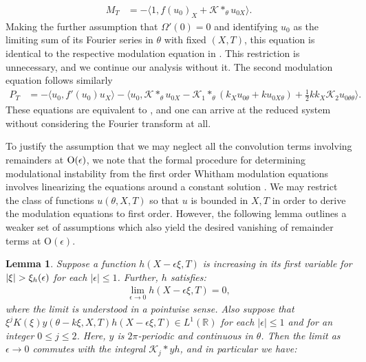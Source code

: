 \documentclass[11pt,leqno]{article}
\numberwithin{equation}{section}
\newcommand{\R}{\mathbb R}
\newtheorem{lemma}[theorem]{Lemma}
\theoremstyle{definition}
\begin{document}
\begin{appendices}
	\begin{align*}
		M_{T} &= -\langle 1, f(u_{0})_{X} + \mathcal{K}*_{\theta}u_{0X} \rangle.
	\end{align*}
	Making the further assumption that $ \Omega'(0) = 0 $ and identifying $ u_{0} $ as the limiting sum of its Fourier series in $ \theta $ with fixed $ (X,T) $, this equation is identical to the respective modulation equation in \cite{BIHS2021}. This restriction is unnecessary, and we continue our analysis without it. The second modulation equation follows similarly
	\begin{align*}
		P_{T} &= -\langle u_{0},f'(u_{0})u_{X} \rangle - \langle u_{0},\mathcal{K}*_{\theta}u_{0X} - \mathcal{K}_{1}*_{\theta}(k_{X}u_{0\theta} + ku_{0X\theta}) + \frac{1}{2}kk_{X}\mathcal{K}_{2}u_{0\theta\theta} \rangle.
	\end{align*}
	These equations are equivalent to , and one can arrive at the reduced system  without considering the Fourier transform at all.
	\par To justify the assumption that we may neglect all the convolution terms involving remainders at $ \rm O(\epsilon) $, we note that the formal procedure for determining modulational instability from the first order Whitham modulation equations involves linearizing the equations around a constant solution \cite{Whitham1999,JZ2010,JMMP2014,JP2020,CM2021}. We may restrict the class of functions $ u(\theta,X,T) $ so that $ u $ is bounded in $ X,T $ in order to derive the modulation equations to first order. However, the following lemma outlines a weaker set of assumptions which also yield the desired vanishing of remainder terms at $ \mathrm{O}(\epsilon) $.
	\begin{lemma}\label{lemma:app1}
		Suppose a function $ h\left(X-\epsilon\xi,T\right) $ is increasing in its first variable for $ \abs{\xi} > \xi_{h}(\epsilon) $ for each $ |\epsilon| \leq 1 $. Further, $ h $ satisfies:
		\begin{align*}
			\lim_{\epsilon\rightarrow 0}h(X-\epsilon\xi,T) = 0,
		\end{align*}
		where the limit is understood in a pointwise sense.	Also suppose that $ \xi^{j}K(\xi)y(\theta - k\xi,X,T)h\left(X-\epsilon\xi,T\right) \in L^{1}(\R) $ for each $ |\epsilon| \leq 1 $ and for an integer $ 0\leq j \leq 2 $. Here, $ y $ is $ 2\pi $-periodic and continuous in $ \theta $. Then the limit as $ \epsilon\rightarrow 0 $ commutes with the integral $ \mathcal{K}_{j}*yh $, and in particular we have:
		\begin{align*}

\end{align*}
\end{lemma}
\end{appendices}
\end{document}
